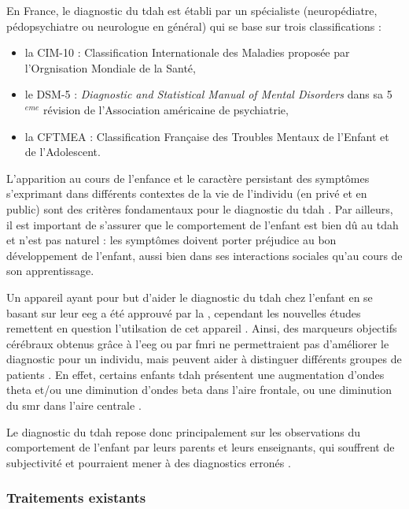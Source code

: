 En France, le diagnostic du \gls{tdah} est établi par un spécialiste (neuropédiatre, pédopsychiatre ou neurologue en général) qui se base sur trois classifications \citep{HAS} :
\begin{itemize}
\item la CIM-10 : Classification Internationale des Maladies proposée par l'Orgnisation Mondiale de la Santé,
\item le DSM-5 : \textit{Diagnostic and Statistical Manual of Mental Disorders} dans sa 5$^{eme}$ révision de l'Association américaine de
psychiatrie,
\item la CFTMEA : Classification Française des Troubles Mentaux de l'Enfant et de l'Adolescent.
\end{itemize}

L'apparition au cours de l'enfance et le caractère persistant des symptômes s'exprimant dans différents contextes de la vie de l'individu (en privé et 
en public) sont des critères fondamentaux pour le diagnostic du \gls{tdah} \citep{HAS}. Par ailleurs, il est important de s'assurer que le comportement de
l'enfant est bien dû au \gls{tdah} et n'est pas naturel : les symptômes doivent porter préjudice au bon développement de l'enfant, aussi bien dans ses
interactions sociales qu'au cours de son apprentissage. 

Un appareil ayant pour but d'aider le diagnostic du \gls{tdah} chez l'enfant en se basant sur leur \gls{eeg} 
a été approuvé par la \citet{FDA} \citep{NebaHealth}, cependant les nouvelles études remettent en question l'utilsation de cet appareil \citep{Arns2013, 
Zhang2017}. Ainsi, des marqueurs objectifs cérébraux obtenus grâce à l'\gls{eeg} ou par \gls{fmri} ne permettraient pas d'améliorer le diagnostic pour un individu, mais
peuvent aider à distinguer différents groupes de patients \citep{Johnstone2005, Zhang2017, Clarke2011}. En effet, certains enfants \gls{tdah} 
présentent une augmentation d'ondes theta et/ou une diminution d'ondes beta dans l'aire frontale, ou une diminution du \gls{smr} dans l'aire centrale
\citep{Monastra2005, Janzen1995, Loo2018}. 

Le diagnostic du \gls{tdah} repose donc principalement sur les observations du comportement de l'enfant par leurs parents et leurs enseignants, qui souffrent de
subjectivité et pourraient mener à des diagnostics erronés \citep{Lambez2019}.

\subsubsection{Traitements existants} \label{traitements_existants}

